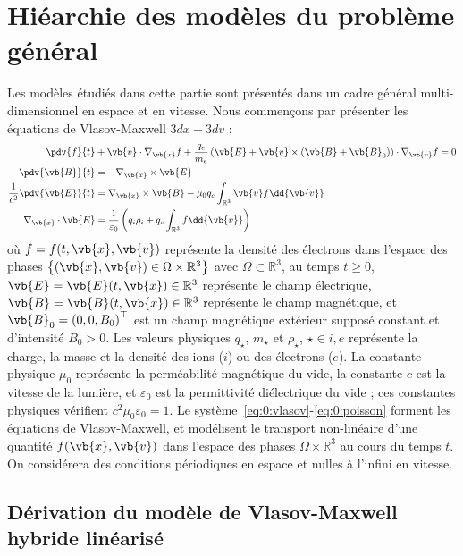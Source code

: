 
\section{Hiéarchie des modèles du problème général}

Les modèles étudiés dans cette partie sont présentés dans un cadre général multi-dimensionnel en espace et en vitesse. Nous commençons par présenter les équations de Vlasov-Maxwell $3dx-3dv$ :
\begin{align}
  \label{eq:0:vlasov}
    \pdv{f}{t} &+ \vb{v}\cdot\nabla_{\vb{x}} f + \frac{q_e}{m_e}\left( \vb{E} + \vb{v}\times(\vb{B}+\vb{B}_0) \right)\cdot\nabla_{\vb{v}} f = 0 \\
  \label{eq:0:maxwellB}
    \pdv{\vb{B}}{t} &= - \nabla_{\vb{x}}\times\vb{E} \\
  \label{eq:0:maxwellE}
    \frac{1}{c^2}\pdv{\vb{E}}{t} &= \nabla_{\vb{x}}\times \vb{B} - \mu_0 q_e\int_{\mathbb{R}^3} \vb{v} f\dd{\vb{v}} \\
  \label{eq:0:poisson}
    \nabla_{\vb{x}}\cdot\vb{E} &= \frac{1}{\varepsilon_0}\left( q_i\rho_i + q_e\int_{\mathbb{R}^3} f\dd{\vb{v}} \right)
\end{align}
où $f=f(t,\vb{x},\vb{v})$ représente la densité des électrons dans l'espace des phases $\left\{ (\vb{x},\vb{v}) \in \Omega\times\mathbb{R}^3 \right\}$ avec $\Omega\subset\mathbb{R}^3$, au temps $t\geq0$, $\vb{E}=\vb{E}(t,\vb{x})\in\mathbb{R}^3$ représente le champ électrique, $\vb{B}=\vb{B}(t,\vb{x})\in\mathbb{R}^3$ représente le champ magnétique, et $\vb{B}_0 = \left(0,0,B_0\right)^\top$ est un champ magnétique extérieur supposé constant et d'intensité $B_0 > 0$. Les valeurs physiques $q_\star$, $m_\star$ et $\rho_\star$, $\star\in{i,e}$ représente la charge, la masse et la densité des ions ($i$) ou des électrons ($e$). La constante physique $\mu_0$ représente la perméabilité magnétique du vide, la constante $c$ est la vitesse de la lumière, et $\varepsilon_0$ est la permittivité diélectrique du vide ; ces constantes physiques vérifient $c^2\mu_0\varepsilon_0=1$. Le système~\eqref{eq:0:vlasov}-\eqref{eq:0:poisson} forment les équations de Vlasov-Maxwell, et modélisent le transport non-linéaire d'une quantité $f(\vb{x},\vb{v})$ dans l'espace des phases $\Omega\times\mathbb{R}^3$ au cours du temps $t$. On considérera des conditions périodiques en espace et nulles à l'infini en vitesse.

\subsection{Dérivation du modèle de Vlasov-Maxwell hybride linéarisé}

